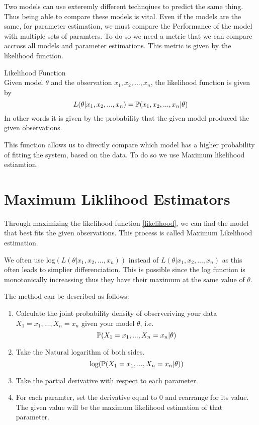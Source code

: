 Two models can use exteremly different technqiues to predict the same thing. Thus being able to compare these models is vital. Even if the models are the same, for parameter estimation, we must compare the Performance of the model with multiple sets of paramters. To do so we need a metric that we can compare accross all models and parameter estimations. This metric is given by the likelihood function.

\begin{definition} Likelihood Function \\
    Given model $\theta$ and the observation $x_1, x_2,...,x_n$, the likelihood function is given by
     \begin{equation}
        \label{likelihood}
        L(\theta|x_1, x_2,...,x_n) = \mathbb{P}(x_1, x_2,...,x_n|\theta)
     \end{equation} 
     In other words it is given by the probability that the given model produced the given observations.
\end{definition}

This function allows us to directly compare which model has a higher probability of fitting the system, based on the data. To do so we use Maximum likelihood estiamtion.


\section{Maximum Liklihood Estimators}

Through maximizing the likelihood function \ref{likelihood}, we can find the model that best fits the given observations. This process is called Maximum Likelihood estimation.

We often use log$(L(\theta|x_1, x_2,...,x_n))$ instead of $L(\theta|x_1, x_2,...,x_n)$ as this often leads to simplier differenciation. This is possible since the log function is monotonically increassing thus they have their maximum at the same value of $\theta$.

The method can be described as follows:
\begin{enumerate}[i]
    \item Calculate the joint probability density of observeriving your data $X_1 = x_1,...,X_n=x_n$ given your model $\theta$, i.e.
    \begin{equation}
        \mathbb{P}(X_1 = x_1,...,X_n=x_n|\theta)
    \end{equation}
    \item Take the Natural logarithm of both sides. 
    \begin{equation}
        \log(\mathbb{P}(X_1 = x_1,...,X_n=x_n|\theta))
    \end{equation}
    \item Take the partial derivative with respect to each parameter.
    \item For each paramter, set the derivative equal to 0 and rearrange for its value. The given value will be the maximum likelihood estimation of that parameter.
\end{enumerate}

